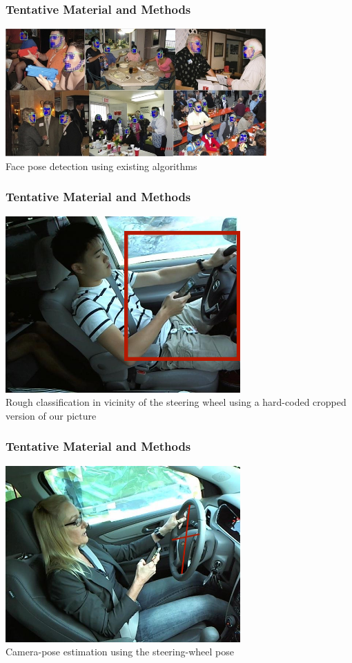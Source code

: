 \documentclass{beamer}
\begin{document}
    \begin{frame}
		\frametitle{Tentative Material and Methods}
        \begin{center}
        \includegraphics[width=10cm]{images/FacePose.jpg}\\
        Face pose detection using existing algorithms\end{center}
    \end{frame}

    \begin{frame}
		\frametitle{Tentative Material and Methods}
        \begin{center}
        \includegraphics[width=9cm]{images/HandLocalisation.jpg}\\
        Rough classification in vicinity of the steering wheel using a hard-coded cropped version of our picture\end{center}
    \end{frame}


    \begin{frame}
		\frametitle{Tentative Material and Methods}
        \begin{center}
        \includegraphics[width=9cm]{images/CameraPose.jpg}\\
        Camera-pose estimation using the steering-wheel pose\end{center}
    \end{frame}
\end{document}
